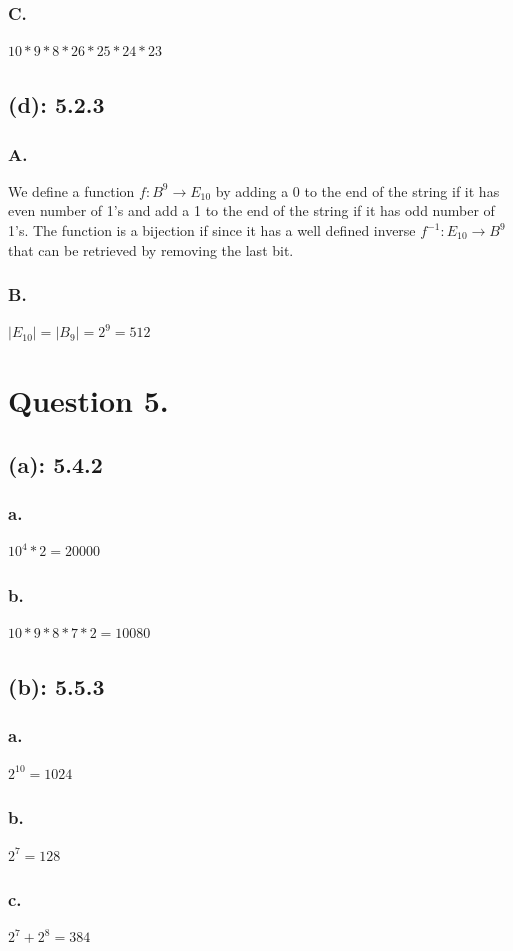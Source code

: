 \documentclass[titlepage]{article}\pagestyle{empty}
\begin{document}
\subsubsection*{C.} $10 * 9 * 8 * 26 * 25 * 24 * 23$
\subsection*{(d): 5.2.3}
\subsubsection*{A.}
We define a function $f:B^9 \rightarrow E_{10}$ by adding a 0 to the end of the string if it has even number of 1's and add a 1 to the end of the string if it has odd number of 1's.
The function is a bijection if since it has a well defined inverse $f^{-1}:E_{10}\rightarrow B^9$ that can be retrieved by removing the last bit.
\subsubsection*{B.} $\vert E_{10}\vert = \vert B_9 \vert=2^9=512$

\pagebreak
\section*{Question 5.}
\subsection*{(a): 5.4.2}
\subsubsection*{a.} $10^4 * 2=20000$
\subsubsection*{b.} $10 * 9 * 8 * 7 * 2=10080$
\subsection*{(b): 5.5.3}
\subsubsection*{a.} $2^{10}=1024$
\subsubsection*{b.} $2^7=128$
\subsubsection*{c.} $2^7 + 2^8=384$
\end{document}

